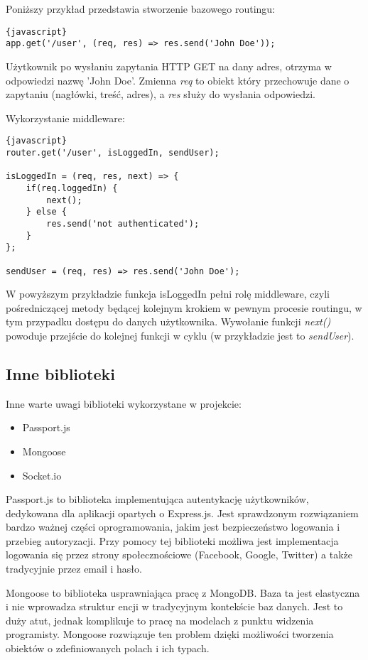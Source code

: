 \documentclass[eng,printmode]{mgr}
\begin{document}
Poniższy przykład przedstawia stworzenie bazowego routingu:
\begin{lstlisting}{javascript}
app.get('/user', (req, res) => res.send('John Doe'));
\end{lstlisting}
Użytkownik po wysłaniu zapytania HTTP GET na dany adres, otrzyma w odpowiedzi nazwę 'John Doe'. Zmienna \textit{req} to obiekt który przechowuje dane o zapytaniu (nagłówki, treść, adres), a \textit{res} służy do wysłania odpowiedzi.

Wykorzystanie middleware:
\begin{lstlisting}{javascript}
router.get('/user', isLoggedIn, sendUser);

isLoggedIn = (req, res, next) => {
	if(req.loggedIn) {
		next();
	} else {
		res.send('not authenticated');
	}
};

sendUser = (req, res) => res.send('John Doe');
\end{lstlisting}
W powyższym przykładzie funkcja isLoggedIn pełni rolę middleware, czyli pośredniczącej metody będącej kolejnym krokiem w pewnym procesie routingu, w tym przypadku dostępu do danych użytkownika. Wywołanie funkcji \textit{next()} powoduje przejście do kolejnej funkcji w cyklu (w przykładzie jest to \textit{sendUser}).
\subsection{Inne biblioteki}
Inne warte uwagi biblioteki wykorzystane w projekcie:
\begin{itemize}
\item Passport.js
\item Mongoose
\item Socket.io
\end{itemize}
Passport.js to biblioteka implementująca autentykację użytkowników, dedykowana dla aplikacji opartych o Express.js. Jest sprawdzonym rozwiązaniem bardzo ważnej części oprogramowania, jakim jest bezpieczeństwo logowania i przebieg autoryzacji. Przy pomocy tej biblioteki możliwa jest implementacja logowania się przez strony społecznościowe (Facebook, Google, Twitter) a także tradycyjnie przez email i hasło. 

Mongoose to biblioteka usprawniająca pracę z MongoDB. Baza ta jest elastyczna i nie wprowadza struktur encji w tradycyjnym kontekście baz danych. Jest to duży atut, jednak komplikuje to pracę na modelach z punktu widzenia programisty. Mongoose rozwiązuje ten problem dzięki możliwości tworzenia obiektów o zdefiniowanych polach i ich typach.
\end{document}
